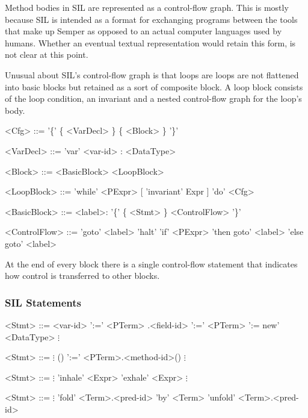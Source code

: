 Method bodies in SIL are represented as a control-flow graph. 
This is mostly because SIL is intended as a format for exchanging programs between the tools that make up Semper as opposed to an actual computer languages used by humans.
Whether an eventual textual representation would retain this form, is not clear at this point.

Unusual about SIL's control-flow graph is that loops are loops are not flattened into basic blocks but retained as a sort of composite block.
A loop block consists of the loop condition, an invariant and a nested control-flow graph for the loop's body.
\begin{grammar}
<Cfg> ::= '\{' \{ <VarDecl> \} \{ <Block> \} '\}'

<VarDecl> ::= 'var' <var-id> : <DataType>

<Block> ::= <BasicBlock>
	\alt <LoopBlock>

<LoopBlock> ::= 'while' <PExpr> [ 'invariant' Expr ] 'do' <Cfg>

<BasicBlock> ::= <label>: '\{' \{ <Stmt> \} <ControlFlow> '\}'

<ControlFlow> ::= 'goto' <label>
	\alt 'halt'
	\alt 'if' <PExpr> 'then goto' <label> 'else goto' <label>
\end{grammar}

At the end of every block there is a single control-flow statement that indicates how control is transferred to other blocks.

\subsubsection{SIL Statements}

\begin{grammar}
<Stmt> ::= <var-id> ':=' <PTerm>
	\alt <var-id>.<field-id> ':=' <PTerm>
	\alt <var-id> ':= new' <DataType>
	\alt	$\vdots$
\end{grammar}
\begin{grammar}
<Stmt> ::= $\vdots$
	\alt () ':=' <PTerm>.<method-id>()
	\alt $\vdots$
\end{grammar}
\begin{grammar}
<Stmt> ::= $\vdots$
	\alt 'inhale' <Expr>
	\alt 'exhale' <Expr>
	\alt $\vdots$
\end{grammar}
\begin{grammar}
<Stmt> ::= $\vdots$
	\alt 'fold' <Term>.<pred-id> 'by' <Term>
	\alt 'unfold' <Term>.<pred-id>
\end{grammar}


